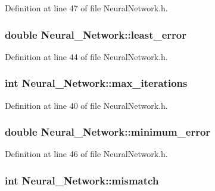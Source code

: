 Definition at line 47 of file Neural\-Network.\-h.

\hypertarget{a00003_a16a71525bcd3f7954146f12036f60da1}{
\subsubsection[{least\-\_\-error}]{\setlength{\rightskip}{0pt plus 5cm}double Neural\-\_\-\-Network\-::least\-\_\-error\hspace{0.3cm}{\ttfamily [private]}}}\label{d1/d7c/a00003_a16a71525bcd3f7954146f12036f60da1}


Definition at line 44 of file Neural\-Network.\-h.

\hypertarget{a00003_ac3c1eed9835dc5da84132d08c090612f}{
\subsubsection[{max\-\_\-iterations}]{\setlength{\rightskip}{0pt plus 5cm}int Neural\-\_\-\-Network\-::max\-\_\-iterations\hspace{0.3cm}{\ttfamily [private]}}}\label{d1/d7c/a00003_ac3c1eed9835dc5da84132d08c090612f}


Definition at line 40 of file Neural\-Network.\-h.

\hypertarget{a00003_aa2898d2ec7ac091b6d40916d4b113a93}{
\subsubsection[{minimum\-\_\-error}]{\setlength{\rightskip}{0pt plus 5cm}double Neural\-\_\-\-Network\-::minimum\-\_\-error\hspace{0.3cm}{\ttfamily [private]}}}\label{d1/d7c/a00003_aa2898d2ec7ac091b6d40916d4b113a93}


Definition at line 46 of file Neural\-Network.\-h.

\hypertarget{a00003_a018a2a3717a3a8bb66fe8914478e29b2}{
\subsubsection[{mismatch}]{\setlength{\rightskip}{0pt plus 5cm}int Neural\-\_\-\-Network\-::mismatch\hspace{0.3cm}{\ttfamily [private]}}}\label{d1/d7c/a00003_a018a2a3717a3a8bb66fe8914478e29b2}



